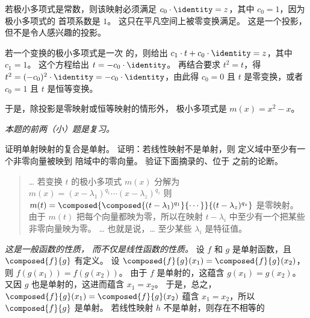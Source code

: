 \begin{exercises}
\begin{answer}
      若极小多项式是常数，则该映射必须满足
      $c_0\cdot\identity=z$，其中 $c_0=1$，因为极小多项式的
      首项系数是 $1$。
      这只在平凡空间上被零变换满足。
      这是一个投影，但不是令人感兴趣的投影。

      若一个变换的极小多项式是一次
      的，则给出 $c_1\cdot t+c_0\cdot\identity=z$，其中 $c_1=1$。
      这个方程给出 $t=-c_0\cdot \identity$。
      再结合要求 $t^2=t$，得
      $t^2=(-c_0)^2\cdot\identity=-c_0\cdot\identity$，由此得
      $c_0=0$ 且 $t$ 是零变换，或者 $c_0=1$ 且
      $t$ 是恒等变换。       

      于是，除投影是零映射或恒等映射的情形外，
      极小多项式是 $m(x)=x^2-x$。 
    \end{answer}
  \item \label{exer:SomeRootsMinPolyAreEigs}
    \textit{本题的前两（小）题是复习。}
    \begin{exparts}
      \partsitem 证明单射映射的复合是单射。
      \partsitem 证明：若线性映射不是单射，则
        定义域中至少有一个非零向量被映到
        陪域中的零向量。
      \partsitem 验证下面摘录的、位于 
        之前的论断。
         \begin{quotation}
           \noindent \ldots{} 
           若变换 $t$ 的极小多项式 $m(x)$ 
           分解为
           $m(x)=(x-\lambda_1)^{q_1}\cdots (x-\lambda_z)^{q_z}$
           则 
           \( m(t)=\composed{\composed{(t-\lambda_1)^{q_1}}{\cdots}}{
                                                        (t-\lambda_z)^{q_z}} \) 
          是零映射。 
          由于 \( m(t) \) 把每个向量都映为零，所以在映射 \( t-\lambda_i \) 
          中至少有一个把某些
          非零向量映为零。  \ldots{}
          也就是说，\ldots{} 
          至少某些 \( \lambda_i \) 是特征值。
        \end{quotation}
    \end{exparts}
    \begin{answer}
      \begin{exparts}
       \partsitem \textit{这是一般函数的性质，
          而不仅是线性函数的性质。}
          设 $f$ 和 $g$ 是单射函数，且
          $\composed{f}{g}$ 有定义。
          设 $\composed{f}{g}(x_1)=\composed{f}{g}(x_2)$，则
          $f(g(x_1))=f(g(x_2))$。
          由于 $f$ 是单射的，这蕴含 $g(x_1)=g(x_2)$。
          又因 $g$ 也是单射的，这进而蕴含
          $x_1=x_2$。
          于是，总之，$\composed{f}{g}(x_1)=\composed{f}{g}(x_2)$
          蕴含 $x_1=x_2$，所以 $\composed{f}{g}$ 是单射。
        \partsitem 若线性映射 $h$ 
          不是单射，则存在不相等的

\end{exparts}
\end{answer}
\end{exercises}

